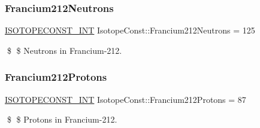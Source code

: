 \subsubsection{\texorpdfstring{Francium212\+Neutrons}{Francium212Neutrons}}
{\footnotesize\ttfamily \mbox{\hyperlink{group___isotope_const-_macros_ga5f18360b3e99483a35c32d789e62621c}{I\+S\+O\+T\+O\+P\+E\+C\+O\+N\+S\+T\+\_\+\+I\+NT}} Isotope\+Const\+::\+Francium212\+Neutrons = 125}

\$ \$ Neutrons in Francium-\/212. \mbox{\label{group___isotope_const-_francium-_fr212_ga81ef79cf25d64c384a05f6aa7fc1247e}} 
\subsubsection{\texorpdfstring{Francium212\+Protons}{Francium212Protons}}
{\footnotesize\ttfamily \mbox{\hyperlink{group___isotope_const-_macros_ga5f18360b3e99483a35c32d789e62621c}{I\+S\+O\+T\+O\+P\+E\+C\+O\+N\+S\+T\+\_\+\+I\+NT}} Isotope\+Const\+::\+Francium212\+Protons = 87}

\$ \$ Protons in Francium-\/212. 
